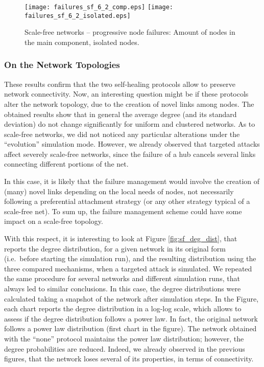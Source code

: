 \documentclass[10pt, conference, compsocconf]{IEEEtran}
\begin{document}
\begin{figure*}[t]
   \centering
   \texttt{[image: failures\_sf\_6\_2\_comp.eps]}
      \hspace{1.5cm}
   \texttt{[image: failures\_sf\_6\_2\_isolated.eps]}
   \caption{Scale-free networks -- progressive node failures: Amount of nodes in the main component, isolated nodes.}
   \label{fig:sf_fail}
\end{figure*}

\subsubsection{On the Network Topologies}
These results confirm that the two self-healing protocols allow to preserve network connectivity.
Now, an interesting question might be if these protocols alter the network topology, due to the creation of novel links among nodes. 
The obtained results show that in general the average degree (and its standard deviation) do not change significantly for uniform and clustered networks. As to scale-free networks, we did not noticed any particular alterations under the ``evolution'' simulation mode. 
However, we already observed that targeted attacks affect severely scale-free networks, since the failure of a hub cancels several links connecting different portions of the net. 

In this case, it is likely that the failure management would involve the creation of (many) novel links depending on the local needs of nodes, not necessarily following a preferential attachment strategy (or any other strategy typical of a scale-free net). To sum up, the failure management scheme could have some impact on a scale-free topology.

With this respect, it is interesting to look at Figure \ref{fig:sf_deg_dist}, that reports the degree distribution, for a given network in its original form (i.e.~before starting the simulation run), and the resulting distribution using the three compared mechanisms, when a targeted attack is simulated. We repeated the same procedure for several networks and different simulation runs, that always led to similar conclusions. In this case, the degree distributions were calculated taking a snapshot of the network after  simulation steps.
In the Figure, each chart reports the degree distribution in a log-log scale, which allows to assess if the degree distribution follows a power law.
In fact, the original network follows a power law distribution (first chart in the figure). The network obtained with the ``none'' protocol maintains the power law distribution; however, the degree probabilities are reduced. Indeed, we already observed in the previous figures, that the network loses several of its properties, in terms of connectivity.
\end{document}
